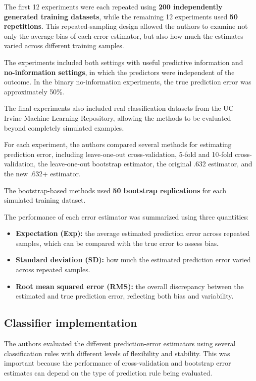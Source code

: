 \documentclass[
  letterpaper,
  DIV=11,
  numbers=noendperiod]{scrreprt}
\providecommand{\tightlist}{%
  \setlength{\itemsep}{0pt}\setlength{\parskip}{0pt}}
\begin{document}
The first 12 experiments were each repeated using \textbf{200
independently generated training datasets}, while the remaining 12
experiments used \textbf{50 repetitions}. This repeated-sampling design
allowed the authors to examine not only the average bias of each error
estimator, but also how much the estimates varied across different
training samples.

The experiments included both settings with useful predictive
information and \textbf{no-information settings}, in which the
predictors were independent of the outcome. In the binary no-information
experiments, the true prediction error was approximately 50\%.

The final experiments also included real classification datasets from
the UC Irvine Machine Learning Repository, allowing the methods to be
evaluated beyond completely simulated examples.

For each experiment, the authors compared several methods for estimating
prediction error, including leave-one-out cross-validation, 5-fold and
10-fold cross-validation, the leave-one-out bootstrap estimator, the
original .632 estimator, and the new .632+ estimator.

The bootstrap-based methods used \textbf{50 bootstrap replications} for
each simulated training dataset.

The performance of each error estimator was summarized using three
quantities:

\begin{itemize}
\tightlist
\item
  \textbf{Expectation (Exp):} the average estimated prediction error
  across repeated samples, which can be compared with the true error to
  assess bias.
\item
  \textbf{Standard deviation (SD):} how much the estimated prediction
  error varied across repeated samples.
\item
  \textbf{Root mean squared error (RMS):} the overall discrepancy
  between the estimated and true prediction error, reflecting both bias
  and variability.
\end{itemize}

\subsection{Classifier
implementation}\label{classifier-implementation-1}

The authors evaluated the different prediction-error estimators using
several classification rules with different levels of flexibility and
stability. This was important because the performance of
cross-validation and bootstrap error estimates can depend on the type of
prediction rule being evaluated.
\end{document}
